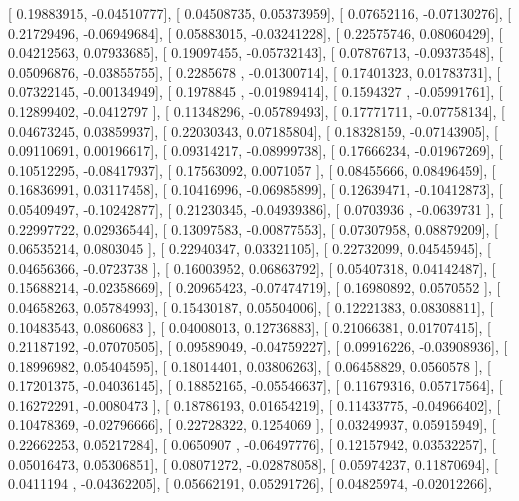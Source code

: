 \documentclass{article}
\begin{document}
       [ 0.19883915, -0.04510777],
       [ 0.04508735,  0.05373959],
       [ 0.07652116, -0.07130276],
       [ 0.21729496, -0.06949684],
       [ 0.05883015, -0.03241228],
       [ 0.22575746,  0.08060429],
       [ 0.04212563,  0.07933685],
       [ 0.19097455, -0.05732143],
       [ 0.07876713, -0.09373548],
       [ 0.05096876, -0.03855755],
       [ 0.2285678 , -0.01300714],
       [ 0.17401323,  0.01783731],
       [ 0.07322145, -0.00134949],
       [ 0.1978845 , -0.01989414],
       [ 0.1594327 , -0.05991761],
       [ 0.12899402, -0.0412797 ],
       [ 0.11348296, -0.05789493],
       [ 0.17771711, -0.07758134],
       [ 0.04673245,  0.03859937],
       [ 0.22030343,  0.07185804],
       [ 0.18328159, -0.07143905],
       [ 0.09110691,  0.00196617],
       [ 0.09314217, -0.08999738],
       [ 0.17666234, -0.01967269],
       [ 0.10512295, -0.08417937],
       [ 0.17563092,  0.0071057 ],
       [ 0.08455666,  0.08496459],
       [ 0.16836991,  0.03117458],
       [ 0.10416996, -0.06985899],
       [ 0.12639471, -0.10412873],
       [ 0.05409497, -0.10242877],
       [ 0.21230345, -0.04939386],
       [ 0.0703936 , -0.0639731 ],
       [ 0.22997722,  0.02936544],
       [ 0.13097583, -0.00877553],
       [ 0.07307958,  0.08879209],
       [ 0.06535214,  0.0803045 ],
       [ 0.22940347,  0.03321105],
       [ 0.22732099,  0.04545945],
       [ 0.04656366, -0.0723738 ],
       [ 0.16003952,  0.06863792],
       [ 0.05407318,  0.04142487],
       [ 0.15688214, -0.02358669],
       [ 0.20965423, -0.07474719],
       [ 0.16980892,  0.0570552 ],
       [ 0.04658263,  0.05784993],
       [ 0.15430187,  0.05504006],
       [ 0.12221383,  0.08308811],
       [ 0.10483543,  0.0860683 ],
       [ 0.04008013,  0.12736883],
       [ 0.21066381,  0.01707415],
       [ 0.21187192, -0.07070505],
       [ 0.09589049, -0.04759227],
       [ 0.09916226, -0.03908936],
       [ 0.18996982,  0.05404595],
       [ 0.18014401,  0.03806263],
       [ 0.06458829,  0.0560578 ],
       [ 0.17201375, -0.04036145],
       [ 0.18852165, -0.05546637],
       [ 0.11679316,  0.05717564],
       [ 0.16272291, -0.0080473 ],
       [ 0.18786193,  0.01654219],
       [ 0.11433775, -0.04966402],
       [ 0.10478369, -0.02796666],
       [ 0.22728322,  0.1254069 ],
       [ 0.03249937,  0.05915949],
       [ 0.22662253,  0.05217284],
       [ 0.0650907 , -0.06497776],
       [ 0.12157942,  0.03532257],
       [ 0.05016473,  0.05306851],
       [ 0.08071272, -0.02878058],
       [ 0.05974237,  0.11870694],
       [ 0.0411194 , -0.04362205],
       [ 0.05662191,  0.05291726],
       [ 0.04825974, -0.02012266],
\end{document}
